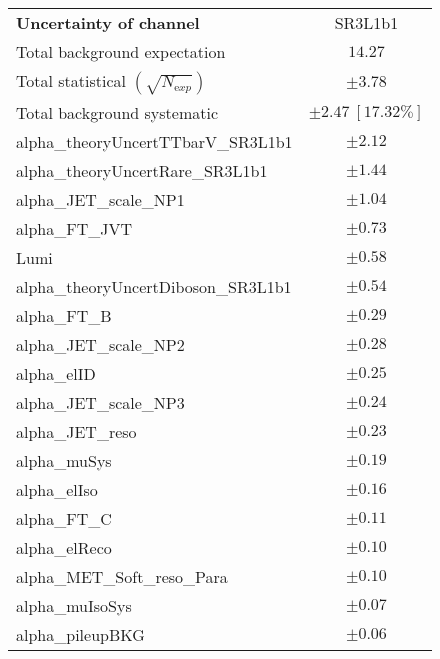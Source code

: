 
\begin{table}
\begin{center}
\setlength{\tabcolsep}{0.0pc}
\begin{tabular*}{\textwidth}{@{\extracolsep{\fill}}lc}
\noalign{\smallskip}\hline\noalign{\smallskip}
{\bfseries Uncertainty of channel}                                    & SR3L1b1            \\
\noalign{\smallskip}\hline\noalign{\smallskip}
Total background expectation             &  $14.27$       \\
\noalign{\smallskip}\hline\noalign{\smallskip}
Total statistical $(\sqrt{N_{\mathrm exp}})$              & $\pm 3.78$       \\
Total background systematic               & $\pm 2.47\ [17.32\%] $             \\
\noalign{\smallskip}\hline\noalign{\smallskip}
\noalign{\smallskip}\hline\noalign{\smallskip}
alpha\_theoryUncertTTbarV\_SR3L1b1         & $\pm 2.12$       \\
alpha\_theoryUncertRare\_SR3L1b1         & $\pm 1.44$       \\
alpha\_JET\_scale\_NP1         & $\pm 1.04$       \\
alpha\_FT\_JVT         & $\pm 0.73$       \\
Lumi         & $\pm 0.58$       \\
alpha\_theoryUncertDiboson\_SR3L1b1         & $\pm 0.54$       \\
alpha\_FT\_B         & $\pm 0.29$       \\
alpha\_JET\_scale\_NP2         & $\pm 0.28$       \\
alpha\_elID         & $\pm 0.25$       \\
alpha\_JET\_scale\_NP3         & $\pm 0.24$       \\
alpha\_JET\_reso         & $\pm 0.23$       \\
alpha\_muSys         & $\pm 0.19$       \\
alpha\_elIso         & $\pm 0.16$       \\
alpha\_FT\_C         & $\pm 0.11$       \\
alpha\_elReco         & $\pm 0.10$       \\
alpha\_MET\_Soft\_reso\_Para         & $\pm 0.10$       \\
alpha\_muIsoSys         & $\pm 0.07$       \\
alpha\_pileupBKG         & $\pm 0.06$       \\

\end{tabular*}
\end{center}
\end{table}
